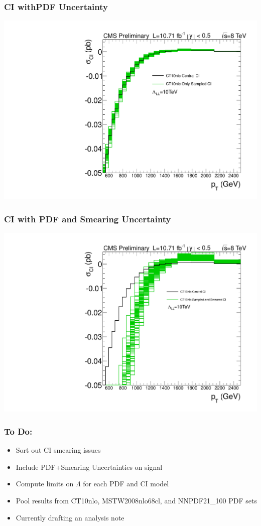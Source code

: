\documentclass{beamer}
\begin{document}
\begin{frame}
	\frametitle{CI  withPDF Uncertainty}
	\begin{*figure}
\begin{center}
 \vspace {0.05 in}
 \includegraphics [width=0.7\linewidth] {10000_LL_sampled_xsec_CT10.pdf}
 \vspace {0.05 in}
\caption{ }
\end{center}
\end{*figure} 
\end{frame}

\begin{frame}
	\frametitle{CI  with PDF and Smearing Uncertainty}
	\begin{*figure}
\begin{center}
 \vspace {0.05 in}
 \includegraphics [width=0.7\linewidth] {10000_LL_sampled_and_smeared_xsec_CT10.pdf}
 \vspace {0.05 in}
\caption{ }
\end{center}
\end{*figure} 
\end{frame}

\begin{frame}
	\frametitle{To Do:}
	\begin{itemize}
		\item Sort out CI smearing issues
		\item Include PDF+Smearing Uncertainties on signal
		\item Compute limits on $\Lambda$ for each PDF and CI model
		\item Pool results from CT10nlo, MSTW2008nlo68cl, and NNPDF21\_100 PDF sets
		\item Currently drafting an analysis note
	\end{itemize}
\end{frame}
\end{document}
